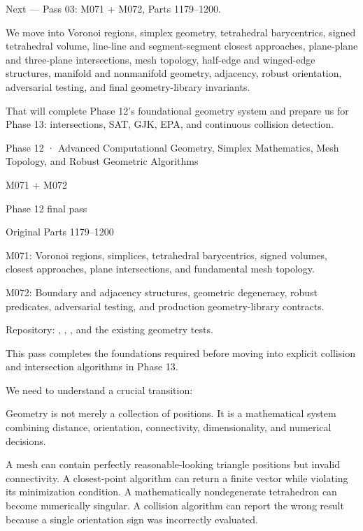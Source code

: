 Next --- Pass 03: M071 + M072, Parts 1179--1200.

We move into Voronoi regions, simplex geometry, tetrahedral barycentrics, signed tetrahedral volume, line-line and segment-segment closest approaches, plane-plane and three-plane intersections, mesh topology, half-edge and winged-edge structures, manifold and nonmanifold geometry, adjacency, robust orientation, adversarial testing, and final geometry-library invariants.

That will complete Phase 12's foundational geometry system and prepare us for Phase 13: intersections, SAT, GJK, EPA, and continuous collision detection.

Phase 12 · Advanced Computational Geometry, Simplex Mathematics, Mesh Topology, and Robust Geometric Algorithms

M071 + M072

Phase 12 final pass

Original Parts 1179--1200

M071: Voronoi regions, simplices, tetrahedral barycentrics, signed volumes, closest approaches, plane intersections, and fundamental mesh topology.

M072: Boundary and adjacency structures, geometric degeneracy, robust predicates, adversarial testing, and production geometry-library contracts.

Repository: , , , and the existing geometry tests.

This pass completes the foundations required before moving into explicit collision and intersection algorithms in Phase 13.

We need to understand a crucial transition:

Geometry is not merely a collection of positions. It is a mathematical system combining distance, orientation, connectivity, dimensionality, and numerical decisions.

A mesh can contain perfectly reasonable-looking triangle positions but invalid connectivity. A closest-point algorithm can return a finite vector while violating its minimization condition. A mathematically nondegenerate tetrahedron can become numerically singular. A collision algorithm can report the wrong result because a single orientation sign was incorrectly evaluated.

